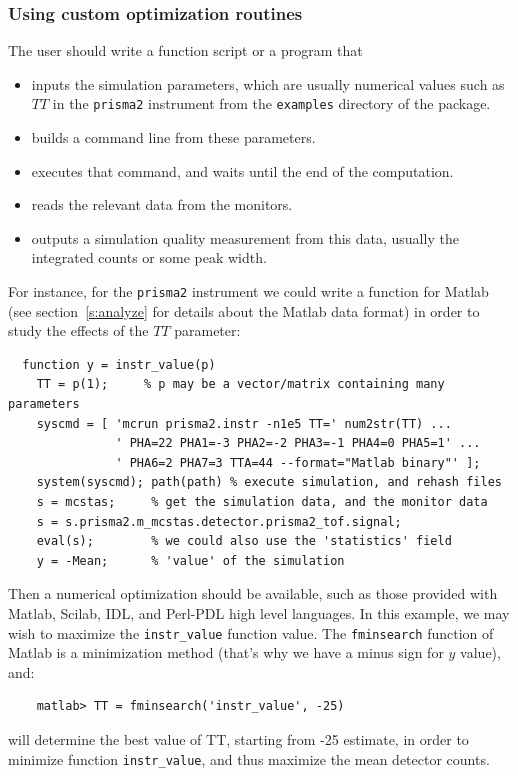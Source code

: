 \subsubsection{Using custom optimization routines}
The user should write a function script or a program that
\begin{itemize}
\item inputs the simulation parameters, which are usually numerical values such as $TT$ in the \verb+prisma2+ instrument from the \verb+examples+ directory of the package.
\item builds a command line from these parameters.
\item executes that command, and waits until the end of the computation.
\item reads the relevant data from the monitors.
\item outputs a simulation quality measurement from this data, usually the integrated counts or some peak width.
\end{itemize}

For instance, for the \verb+prisma2+ instrument we could write a function for Matlab (see section~\ref{s:analyze} for details about the Matlab data format) in order to study the effects of the $TT$ parameter:
\begin{verbatim}
  function y = instr_value(p)
    TT = p(1);     % p may be a vector/matrix containing many parameters
    syscmd = [ 'mcrun prisma2.instr -n1e5 TT=' num2str(TT) ...
               ' PHA=22 PHA1=-3 PHA2=-2 PHA3=-1 PHA4=0 PHA5=1' ...
               ' PHA6=2 PHA7=3 TTA=44 --format="Matlab binary"' ];
    system(syscmd); path(path) % execute simulation, and rehash files
    s = mcstas;     % get the simulation data, and the monitor data
    s = s.prisma2.m_mcstas.detector.prisma2_tof.signal;
    eval(s);        % we could also use the 'statistics' field
    y = -Mean;      % 'value' of the simulation
\end{verbatim}

Then a numerical optimization should be available, such as those provided with Matlab, Scilab, IDL, and Perl-PDL high level languages. In this example, we may wish to maximize the \verb+instr_value+ function value. The \verb+fminsearch+ function of Matlab is a minimization method (that's why we have a minus sign for $y$ value), and:
\begin{verbatim}
    matlab> TT = fminsearch('instr_value', -25)
\end{verbatim}
will determine the best value of TT, starting from -25 estimate, in order to minimize function \verb+instr_value+, and thus maximize the mean detector counts.

